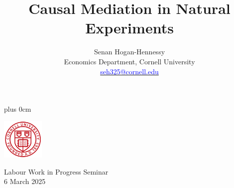 \documentclass[dvipsnames,handout]{beamer} %
\title{\color{titleText}
    Causal Mediation in Natural Experiments
}
\author[Senan Hogan-Hennessy, Cornell University]{
    Senan Hogan-Hennessy \\
    Economics Department, Cornell University \\ %
    \href{mailto:seh325@cornell.edu}{\textcolor{blue}{seh325@cornell.edu}}
}
\date{} %
\renewcommand{\raggedright}{\leftskip=0pt \rightskip=0pt plus 0cm}
\begin{document}
\raggedright
\begin{frame}
    \titlepage
    \vspace{-1.5cm}
    \begin{center}
        \includegraphics[width=2cm]{presentation-files/cornell}

        \vspace{0.5cm}
        Labour Work in Progress Seminar \\
        6 March 2025
    \end{center}
\end{frame}

\end{document}
